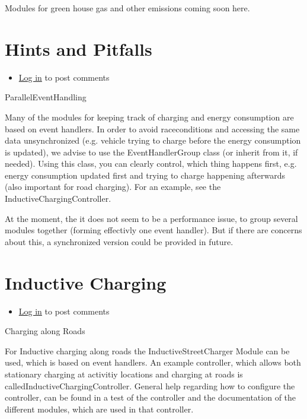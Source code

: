 \documentclass[a4paper,11pt]{report}
\begin{document}
Modules for green house gas and other emissions coming soon here.

\vfill\eject
\section{Hints and Pitfalls}
\begin{itemize}
	\item \href{http://www.matsim.org/user/login?destination=comment/reply/718%23comment-form}{Log in} to post comments
\end{itemize}

ParallelEventHandling

Many of the modules for keeping track of charging and energy  consumption are based on event handlers. In order to avoid  raceconditions and accessing the same data unsynchronized (e.g. vehicle  trying to charge before the energy consumption is updated), we advise to  use the EventHandlerGroup class (or inherit from it, if needed). Using  this class, you can clearly control, which thing happens first, e.g.  energy consumption updated first and trying to charge happening  afterwards (also important for road charging). For an example, see the  InductiveChargingController.

At the moment, the it does not seem to be a performance issue, to  group several modules together (forming effectivly one event handler).  But if there are concerns about this, a synchronized version could be  provided in future.

\vfill\eject
\section{Inductive Charging}
\begin{itemize}
	\item \href{http://www.matsim.org/user/login?destination=comment/reply/715%23comment-form}{Log in} to post comments
\end{itemize}

Charging along Roads

For Inductive charging along roads the InductiveStreetCharger Module  can be used, which is based on event handlers. An example controller,  which allows both stationary charging at activitiy locations and  charging at roads is calledInductiveChargingController. General  help regarding how to configure the controller, can be found in a test  of the controller and the documentation of the different modules, which  are used in that controller.
\end{document}
